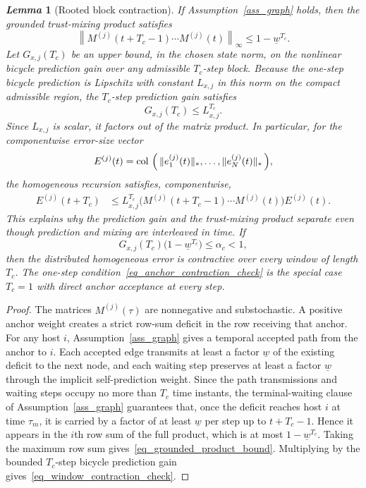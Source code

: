 \documentclass[letterpaper,journal]{IEEEtran}
\def\col#1{\mathop{{\rm col}\,\left(\,#1\,\right)}}
\newtheorem{lemma}{\it Lemma}%
\begin{document}
\begin{lemma}[Rooted block contraction]\label{lem_rooted_block_contraction}
If Assumption~\ref{ass_graph} holds, then the grounded trust-mixing product satisfies
\begin{equation}
    \left\|
    M^{(j)}(t+T_c-1)\cdots M^{(j)}(t)
    \right\|_{\infty}
    \le 1-\underline w^{T_c} .
    \label{eq_grounded_product_bound}
\end{equation}
Let $G_{x,j}(T_c)$ be an upper bound, in the chosen state norm, on the nonlinear bicycle prediction gain over any admissible $T_c$-step block. Because the one-step bicycle prediction is Lipschitz with constant $L_{x,j}$ in this norm on the compact admissible region, the $T_c$-step prediction gain satisfies
\begin{equation}
    G_{x,j}(T_c)\le L_{x,j}^{T_c}.
\end{equation}
Since $L_{x,j}$ is scalar, it factors out of the matrix product. In particular, for the componentwise error-size vector
\begin{equation}
E^{(j)}(t)=\col{\|e_1^{(j)}(t)\|_*,\ldots,\|e_N^{(j)}(t)\|_*},
\end{equation}
the homogeneous recursion satisfies, componentwise,
\begin{align}
E^{(j)}(t+T_c)
&\le L_{x,j}^{T_c}
\big(M^{(j)}(t+T_c-1)\cdots M^{(j)}(t)\big)
E^{(j)}(t).
\label{eq_componentwise_block_bound}
\end{align}
This explains why the prediction gain and the trust-mixing product separate even though prediction and mixing are interleaved in time. If
\begin{equation}
    G_{x,j}(T_c)\big(1-\underline w^{T_c}\big)
    \le \alpha_c<1,
    \label{eq_window_contraction_check}
\end{equation}
then the distributed homogeneous error is contractive over every window of length $T_c$. The one-step condition~\eqref{eq_anchor_contraction_check} is the special case $T_c=1$ with direct anchor acceptance at every step.
\end{lemma}
\begin{proof}
The matrices $M^{(j)}(\tau)$ are nonnegative and substochastic. A positive anchor weight creates a strict row-sum deficit in the row receiving that anchor. For any host $i$, Assumption~\ref{ass_graph} gives a temporal accepted path from the anchor to $i$. Each accepted edge transmits at least a factor $\underline w$ of the existing deficit to the next node, and each waiting step preserves at least a factor $\underline w$ through the implicit self-prediction weight. Since the path transmissions and waiting steps occupy no more than $T_c$ time instants, the terminal-waiting clause of Assumption~\ref{ass_graph} guarantees that, once the deficit reaches host $i$ at time $\tau_m$, it is carried by a factor of at least $\underline w$ per step up to $t+T_c-1$. Hence it appears in the $i$th row sum of the full product, which is at most $1-\underline w^{T_c}$. Taking the maximum row sum gives~\eqref{eq_grounded_product_bound}. Multiplying by the bounded $T_c$-step bicycle prediction gain gives~\eqref{eq_window_contraction_check}.
\end{proof}
\end{document}
